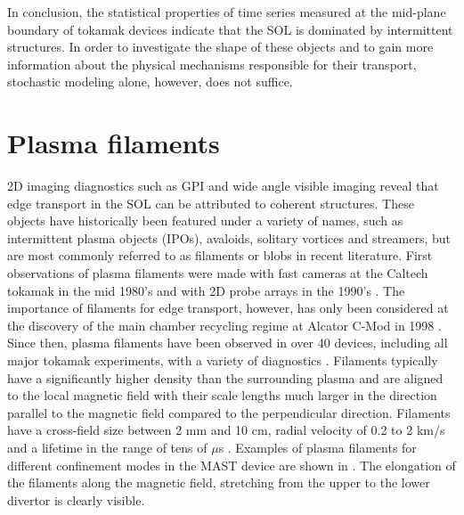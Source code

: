 In conclusion, the statistical properties of time series measured at the mid-plane boundary of tokamak devices indicate that the SOL is dominated by intermittent structures. In order to investigate the shape of these objects and to gain more information about the physical mechanisms responsible for their transport, stochastic modeling alone, however, does not suffice. 

\section{Plasma filaments}
2D imaging diagnostics such as GPI and wide angle visible imaging reveal that edge transport in the SOL can be attributed to coherent structures. These objects have historically been featured under a variety of names, such as intermittent plasma objects (IPOs), avaloids, solitary vortices and streamers, but are most commonly referred to as filaments or blobs in recent literature. First observations of plasma filaments were made with fast cameras at the Caltech tokamak in the mid 1980's \cite{zweben1985search,zweben1985structure,park1987sj} and with 2D probe arrays in the 1990's \cite{endler1995measurements,endler1999turbulent}. The importance of filaments for edge transport, however, has only been considered at the discovery of the main chamber recycling regime at Alcator C-Mod in 1998 \cite{umansky1998comments}. Since then, plasma filaments have been observed in over 40 devices, including all major tokamak experiments, with a variety of diagnostics \cite{d2011convective}. Filaments typically have a significantly higher density than the surrounding plasma and are aligned to the local magnetic field with their scale lengths much larger in the direction parallel to the magnetic field compared to the perpendicular direction. Filaments have a cross-field size 
between 2 mm and 10 cm, radial velocity of 0.2 to 2 km/s and a lifetime in the range of tens of $\mu$s \cite{kirk2016mode,dudson2008experiments,zweben2002edge,kube2013blob,myra2006blob,boedo2001transport,silva2004fluctuation,carralero2015experimental,muller2009studies}. Examples of plasma filaments for different confinement modes in the MAST device are shown in . The elongation of the filaments along the magnetic field, stretching from the upper to the lower divertor is clearly visible.  
